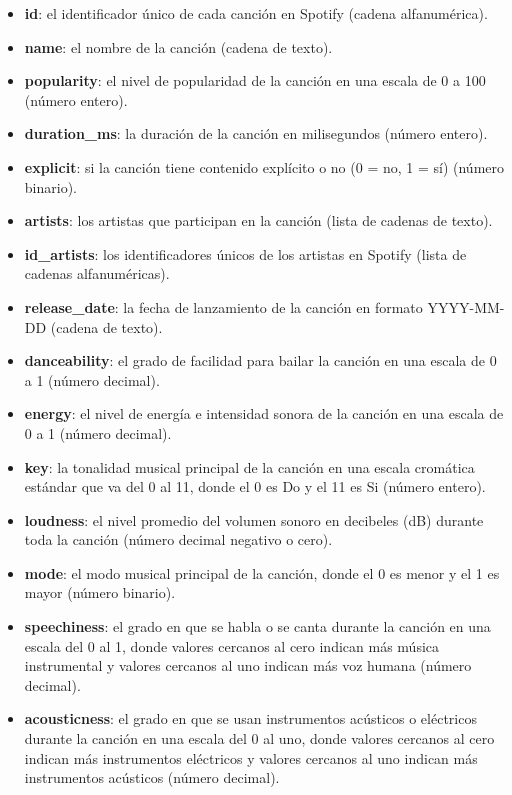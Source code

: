 \documentclass{wsdcr}
\begin{document}
\begin{itemize}
    \item \textbf{id}: el identificador único de cada canción en Spotify (cadena alfanumérica).
    \item \textbf{name}: el nombre de la canción (cadena de texto).
    \item \textbf{popularity}: el nivel de popularidad de la canción en una escala de 0 a 100 (número entero).
    \item \textbf{duration\_ms}: la duración de la canción en milisegundos (número entero).
    \item \textbf{explicit}: si la canción tiene contenido explícito o no (0 = no, 1 = sí) (número binario).
    \item \textbf{artists}: los artistas que participan en la canción (lista de cadenas de texto).
    \item \textbf{id\_artists}: los identificadores únicos de los artistas en Spotify (lista de cadenas alfanuméricas).
    \item \textbf{release\_date}: la fecha de lanzamiento de la canción en formato YYYY-MM-DD (cadena de texto).
    \item \textbf{danceability}: el grado de facilidad para bailar la canción en una escala de 0 a 1 (número decimal).
    \item \textbf{energy}: el nivel de energía e intensidad sonora de la canción en una escala de 0 a 1 (número decimal).
    \item \textbf{key}: la tonalidad musical principal de la canción en una escala cromática estándar que va del 0 al 11, donde el 0 es Do y el 11 es Si (número entero).
    \item \textbf{loudness}: el nivel promedio del volumen sonoro en decibeles (dB) durante toda la canción (número decimal negativo o cero).
    \item \textbf{mode}: el modo musical principal de la canción, donde el 0 es menor y el 1 es mayor (número binario).
    \item \textbf{speechiness}: el grado en que se habla o se canta durante la canción en una escala del 0 al 1, donde valores cercanos al cero indican más música instrumental y valores cercanos al uno indican más voz humana (número decimal).
    \item \textbf{acousticness}: el grado en que se usan instrumentos acústicos o eléctricos durante la canción en una escala del 0 al uno, donde valores cercanos al cero indican más instrumentos eléctricos y valores cercanos al uno indican más instrumentos acústicos (número decimal).

\end{itemize}
\end{document}
